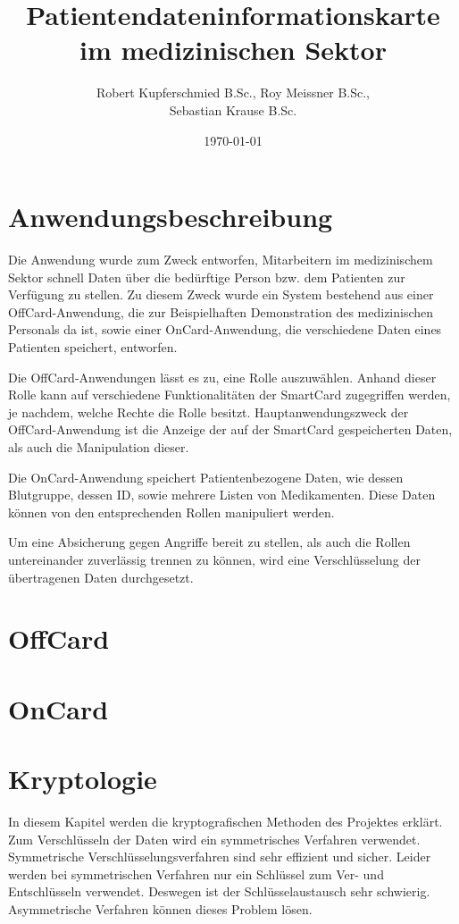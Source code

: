 \documentclass[parskip]{scrartcl}
\begin{document}
\subject{Projektdokumentation im Modul Smartcard}
\title{Patientendateninformationskarte im medizinischen Sektor}
\author{Robert Kupferschmied B.Sc., Roy Meissner B.Sc.,\\Sebastian Krause B.Sc.}
\date{\today}

\maketitle
\onehalfspacing
\section{Anwendungsbeschreibung}
	Die Anwendung wurde zum Zweck entworfen, Mitarbeitern im medizinischem Sektor schnell Daten über die bedürftige Person bzw. dem Patienten zur Verfügung zu stellen. Zu diesem Zweck wurde ein System bestehend aus einer OffCard-Anwendung, die zur Beispielhaften Demonstration des medizinischen Personals da ist, sowie einer OnCard-Anwendung, die verschiedene Daten eines Patienten speichert, entworfen.
	
	Die OffCard-Anwendungen lässt es zu, eine Rolle auszuwählen. Anhand dieser Rolle kann auf verschiedene Funktionalitäten der SmartCard zugegriffen werden, je nachdem, welche Rechte die Rolle besitzt. Hauptanwendungszweck der OffCard-Anwendung ist die Anzeige der auf der SmartCard gespeicherten Daten, als auch die Manipulation dieser.
	
	Die OnCard-Anwendung speichert Patientenbezogene Daten, wie dessen Blutgruppe, dessen ID, sowie mehrere Listen von Medikamenten. Diese Daten können von den entsprechenden Rollen manipuliert werden.
	
	Um eine Absicherung gegen Angriffe bereit zu stellen, als auch die Rollen untereinander zuverlässig trennen zu können, wird eine Verschlüsselung der übertragenen Daten durchgesetzt.
\section{OffCard}
\section{OnCard}
\section{Kryptologie}
In diesem Kapitel werden die kryptografischen Methoden des Projektes erklärt. Zum Verschlüsseln der Daten wird ein symmetrisches Verfahren verwendet. Symmetrische Verschlüsselungsverfahren sind sehr effizient und sicher. Leider werden bei symmetrischen Verfahren nur ein Schlüssel zum Ver- und Entschlüsseln verwendet. Deswegen ist der Schlüsselaustausch sehr schwierig. Asymmetrische Verfahren können dieses Problem lösen.
\end{document}

